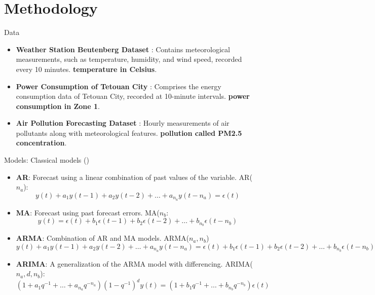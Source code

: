 \documentclass[aspectratio=16 9,10pt]{beamer}
\begin{document}
\section{Methodology}
\begin{frame}{Data}
\begin{itemize}
    \item \textbf{Weather Station Beutenberg Dataset} \textcite{weather2020}: Contains meteorological measurements, such as temperature, humidity, and wind speed, recorded every 10 minutes. \textbf{temperature in Celsius}. 
    
    \item \textbf{Power Consumption of Tetouan City} \textcite{power_consumption_of_tetouan_city_849}: Comprises the energy consumption data of Tetouan City, recorded at 10-minute intervals. \textbf{power consumption in Zone 1}.
    
    \item \textbf{Air Pollution Forecasting Dataset} \textcite{kaggle_lstm_dataset}: Hourly measurements of air pollutants along with meteorological features. \textbf{pollution called PM2.5 concentration}.
\end{itemize}
\end{frame}

\begin{frame}{Models: Classical models (\textcite{box2015time})}
\begin{itemize}
    \item \textbf{AR}: Forecast using a linear combination of past values of the variable. AR(\( n_a \)): 
    \[
    y(t) + a_1 y(t-1) + a_2 y(t-2) + \dots + a_{n_a} y(t-{n_a}) = \epsilon(t)
    \]
    
    \item \textbf{MA}: Forecast using past forecast errors. MA(\( n_b \):
    \[
    y(t) = \epsilon(t) + b_1 \epsilon(t-1) + b_2 \epsilon(t-2) + \dots + b_{n_b} \epsilon(t - n_b)
    \]
    
    \item \textbf{ARMA}: Combination of AR and MA models. ARMA(\(n_a, n_b\))
    \[
    y(t) + a_1 y(t-1) + a_2 y(t-2) + \dots + a_{n_a} y(t-{n_a}) = \epsilon(t) + b_1 \epsilon(t-1) + b_2 \epsilon(t-2) + \dots + b_{n_b} \epsilon(t - n_b)
    \]

    \item \textbf{ARIMA}: A generalization of the ARMA model with differencing. ARIMA(\(n_a, d, n_b\)):
    $$
    \left(1+a_1 q^{-1}+\dots+a_{n_a} q^{-n_a}\right)\left(1-q^{-1}\right)^d y(t) = \left(1+b_1 q^{-1}+\dots+b_{n_b} q^{-n_b}\right)\epsilon(t)$$
\end{itemize}
\end{frame}
\end{document}
